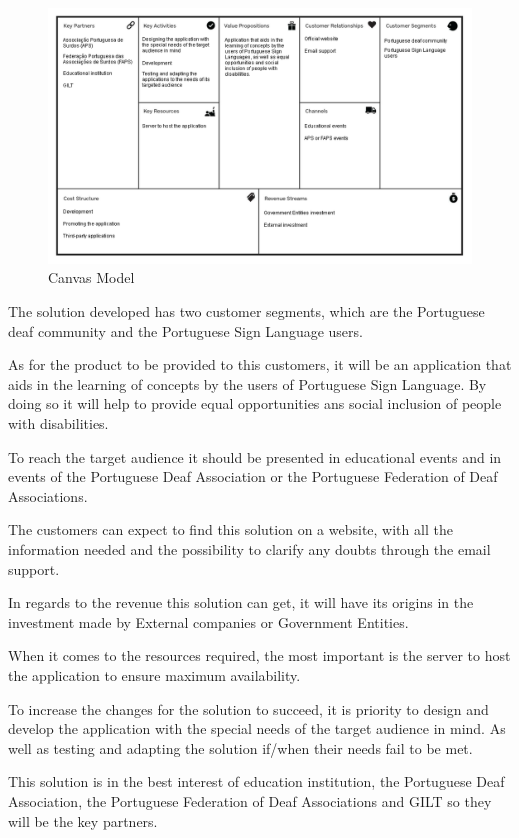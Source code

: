 \begin{figure}[H]
\centering
\includegraphics[width=\textwidth,keepaspectratio]{ch3/assets/CANVAS.png}
\caption[Canvas Model]{Canvas Model}
\label{fig:CANVAS}
\end{figure}

The solution developed has two customer segments, which are the Portuguese deaf community and the Portuguese Sign Language users.

As for the product to be provided to this customers, it will be an application that aids in the learning of concepts by the users of Portuguese Sign Language.
By doing so it will help to provide equal opportunities ans social inclusion of people with disabilities.

To reach the target audience it should be presented in educational events and in events of the Portuguese Deaf Association or the Portuguese Federation of Deaf Associations.

The customers can expect to find this solution on a website, with all the information needed and the possibility to clarify any doubts through the email support.

In regards to the revenue this solution can get, it will have its origins in the investment made by External companies or Government Entities.

When it comes to the resources required, the most important is the server to host the application to ensure maximum availability.

To increase the changes for the solution to succeed, it is priority to design and develop the application with the special needs of the target audience in mind.
As well as testing and adapting the solution if/when their needs fail to be met.

This solution is in the best interest of education institution, the Portuguese Deaf Association, the Portuguese Federation of Deaf Associations and GILT so they will be the key partners.

